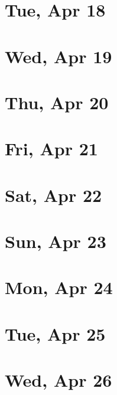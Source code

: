 	\section{Tue, Apr 18}
		
		
	\section{Wed, Apr 19}
		
		
	\section{Thu, Apr 20}
		
		
	\section{Fri, Apr 21}
		
		
	\section{Sat, Apr 22}
		
		
	\section{Sun, Apr 23}
		
		
	\section{Mon, Apr 24}
		
		
	\section{Tue, Apr 25}
		
		
	\section{Wed, Apr 26}
		
		
